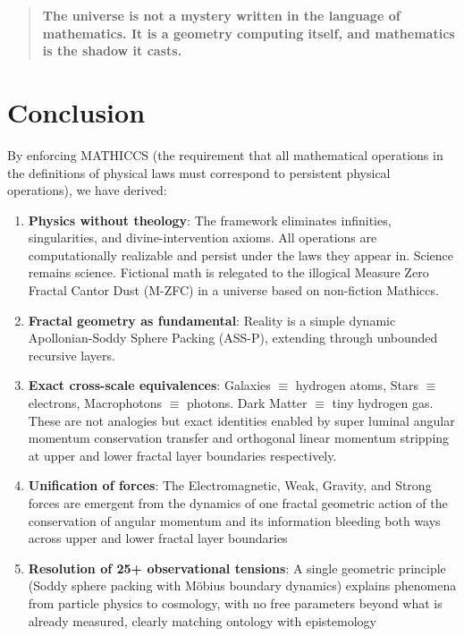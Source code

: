 \documentclass[11pt,a4paper]{article}
\begin{document}
\begin{quote}
\textbf{The universe is not a mystery written in the language of mathematics. It is a geometry computing itself, and mathematics is the shadow it casts.}
\end{quote}

\section{Conclusion}

By enforcing MATHICCS (the requirement that all mathematical operations in the definitions of physical laws must correspond to persistent physical operations), we have derived:

\begin{enumerate}

\item \textbf{Physics without theology}: The framework eliminates infinities, singularities, and divine-intervention axioms. All operations are computationally realizable and persist under the laws they appear in. Science remains science. Fictional math is relegated to the illogical Measure Zero Fractal Cantor Dust (M-ZFC) in a universe based on non-fiction Mathiccs. 

\item \textbf{Fractal geometry as fundamental}: Reality is a simple dynamic Apollonian-Soddy Sphere Packing (ASS-P), extending through unbounded recursive layers.

\item \textbf{Exact cross-scale equivalences}: Galaxies $\equiv$ hydrogen atoms, Stars $\equiv$ electrons, Macrophotons $\equiv$ photons. Dark Matter $\equiv$ tiny hydrogen gas. These are not analogies but exact identities enabled by super luminal angular momentum conservation transfer and orthogonal linear momentum stripping at upper and lower fractal layer boundaries respectively.

\item \textbf{Unification of forces}: The Electromagnetic, Weak, Gravity, and Strong forces are emergent from the dynamics of one fractal geometric action of the conservation of angular momentum and its information bleeding both ways across upper and lower fractal layer boundaries 

\item \textbf{Resolution of 25+ observational tensions}: A single geometric principle (Soddy sphere packing with Möbius boundary dynamics) explains phenomena from particle physics to cosmology, with no free parameters beyond what is already measured, clearly matching ontology with epistemology 


\end{enumerate}
\end{document}
